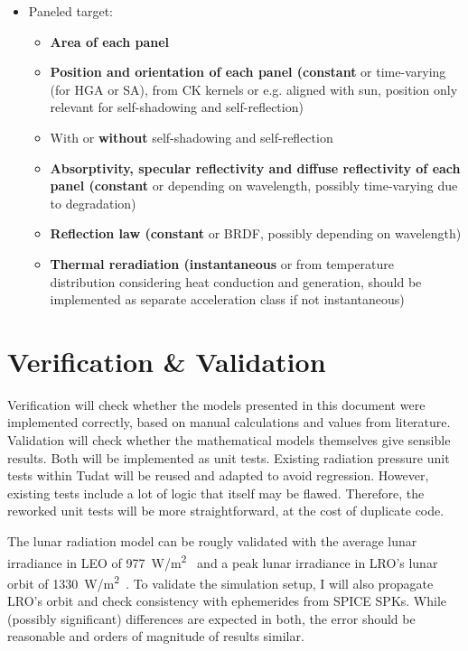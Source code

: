 \documentclass[parskip=full,DIV=15]{scrartcl}
\begin{document}
\begin{itemize}
   \item Paneled target:
   \begin{itemize}
      \item \textbf{Area of each panel}
      \item \textbf{Position and orientation of each panel (constant} or time-varying (for HGA or SA), from CK kernels or e.g. aligned with sun, position only relevant for self-shadowing and self-reflection)
      \item With or \textbf{without} self-shadowing and self-reflection
      \item \textbf{Absorptivity, specular reflectivity and diffuse reflectivity of each panel (constant} or depending on wavelength, possibly time-varying due to degradation)
      \item \textbf{Reflection law (constant} or BRDF, possibly depending on wavelength)
      \item \textbf{Thermal reradiation (instantaneous} or from temperature distribution considering heat conduction and generation, should be implemented as separate acceleration class if not instantaneous)
   \end{itemize}
\end{itemize}







\section{Verification \& Validation}
Verification will check whether the models presented in this document were implemented correctly, based on manual calculations and values from literature. Validation will check whether the mathematical models themselves give sensible results. Both will be implemented as unit tests. Existing radiation pressure unit tests within Tudat will be reused and adapted to avoid regression. However, existing tests include a lot of logic that itself may be flawed. Therefore, the reworked unit tests will be more straightforward, at the cost of duplicate code.

The lunar radiation model can be rougly validated with the average lunar irradiance in LEO of \SI{977}{W/m^2}~\cite{Matthews2008} and a peak lunar irradiance in LRO's lunar orbit of \SI{1330}{W/m^2}~\cite{Tooley2010}. To validate the simulation setup, I will also propagate LRO's orbit and check consistency with ephemerides from SPICE SPKs. While (possibly significant) differences are expected in both, the error should be reasonable and orders of magnitude of results similar.
\end{document}
